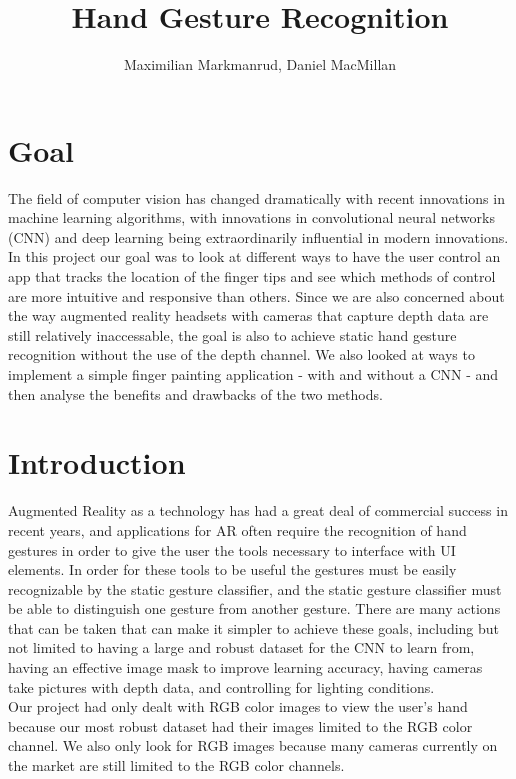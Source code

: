 \documentclass[twocolumn]{article}
\title{Hand Gesture Recognition}
\author{Maximilian Markmanrud, Daniel MacMillan}
\begin{document}
\maketitle

\section{Goal}
The field of computer vision has changed dramatically with recent innovations in machine learning algorithms, with innovations in convolutional neural networks (CNN) and deep learning being extraordinarily influential in modern innovations. In this project our goal was to look at different ways to have the user control an app that tracks the location of the finger tips and see which methods of control are more intuitive and responsive than others. Since we are also concerned about the way augmented reality headsets with cameras that capture depth data are still relatively inaccessable, the goal is also to achieve static hand gesture recognition without the use of the depth channel. We also looked at ways to implement a simple finger painting application - with and without a CNN - and then analyse the benefits and drawbacks of the two methods.\\

\section{Introduction}
Augmented Reality as a technology has had a great deal of commercial success in recent years, and applications for AR often require the recognition of hand gestures in order to give the user the tools necessary to interface with UI elements. In order for these tools to be useful the gestures must be easily recognizable by the static gesture classifier, and the static gesture classifier must be able to distinguish one gesture from another gesture. There are many actions that can be taken that can make it simpler to achieve these goals, including but not limited to having a large and robust dataset for the CNN to learn from, having an effective image mask to improve learning accuracy, having cameras take pictures with depth data, and controlling for lighting conditions.\\

Our project had only dealt with RGB color images to view the user's hand because our most robust dataset had their images limited to the RGB color channel. We also only look for RGB images because many cameras currently on the market are still limited to the RGB color channels.\\
\end{document}
